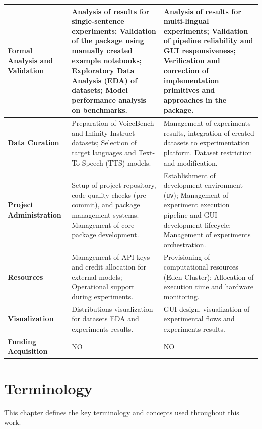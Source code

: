 \begin{longtable}{| L{2.5cm} | L{6cm} | L{6cm} |}
    \textbf{Formal Analysis and Validation} &
    Analysis of results for single-sentence experiments; Validation of the package using manually created example notebooks; Exploratory Data Analysis (EDA) of datasets; Model performance analysis on benchmarks. &
    Analysis of results for multi-lingual experiments; Validation of pipeline reliability and GUI responsiveness; Verification and correction of implementation primitives and approaches in the package. \\
    \hline

    \textbf{Data Curation} &
    Preparation of VoiceBench and Infinity-Instruct datasets; Selection of target languages and Text-To-Speech (TTS) models. &
    Management of experiments results, integration of created datasets to experimentation platform. Dataset restriction and modification.\\
    \hline

    \textbf{Project Administration} &
    Setup of project repository, code quality checks (pre-commit), and package management systems. Management of core package development. &
    Establishment of development environment (\texttt{uv}); Management of experiment execution pipeline and GUI development lifecycle; Management of experiments orchestration. \\
    \hline

    \textbf{Resources} &
    Management of API keys and credit allocation for external models; Operational support during experiments. &
    Provisioning of computational resources (Eden Cluster); Allocation of execution time and hardware monitoring. \\
    \hline

    \textbf{Visualization} &
    Distributions visualization for datasets EDA and experiments results. &
    GUI design, visualization of experimental flows and experiments results. \\
    \hline

    \textbf{Funding Acquisition} &
    NO &
    NO \\

    \end{longtable}

\chapter*{Terminology}

This chapter defines the key terminology and concepts used throughout this work.

